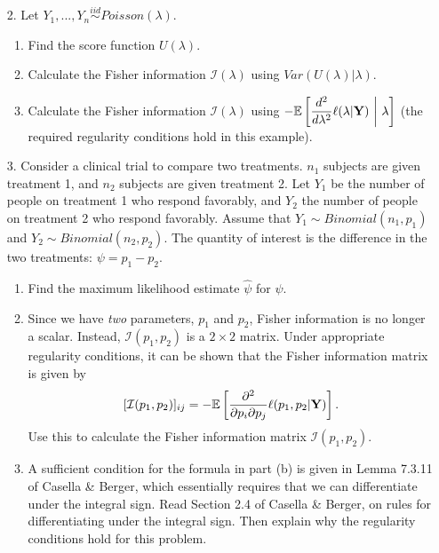 \documentclass[11pt]{article}
\begin{document}
\begin{enumerate}
\item[2.] Let $Y_1,...,Y_n \overset{iid}{\sim} Poisson(\lambda)$.
\begin{enumerate}
\item Find the score function $U(\lambda)$.
\item Calculate the Fisher information $\mathcal{I}(\lambda)$ using $Var(U(\lambda) | \lambda)$.
\item Calculate the Fisher information $\mathcal{I}(\lambda)$ using $-\mathbb{E}\left[ \dfrac{d^2}{d \lambda^2} \ell(\lambda | {\bf Y}) \ \biggr\lvert \ \lambda \right]$ (the required regularity conditions hold in this example).
\end{enumerate}

\item[3.] Consider a clinical trial to compare two treatments. $n_1$ subjects are given treatment 1, and $n_2$ subjects are given treatment 2. Let $Y_1$ be the number of people on treatment 1 who respond favorably, and $Y_2$ the number of people on treatment 2 who respond favorably. Assume that $Y_1 \sim Binomial(n_1, p_1)$ and $Y_2 \sim Binomial(n_2, p_2)$. The quantity of interest is the difference in the two treatments: $\psi = p_1 - p_2$.

\begin{enumerate}
\item Find the maximum likelihood estimate $\widehat{\psi}$ for $\psi$.

\item Since we have \textit{two} parameters, $p_1$ and $p_2$, Fisher information is no longer a scalar. Instead, $\mathcal{I}(p_1, p_2)$ is a $2 \times 2$ matrix. Under appropriate regularity conditions, it can be shown that the Fisher information matrix is given by
$$[\mathcal{I}(p_1, p_2)]_{ij} = - \mathbb{E}\left[ \frac{\partial^2}{\partial p_i \partial p_j} \ell(p_1, p_2 | {\bf Y}) \right].$$
Use this to calculate the Fisher information matrix $\mathcal{I}(p_1, p_2)$.

\item A sufficient condition for the formula in part (b) is given in Lemma 7.3.11 of Casella \& Berger, which essentially requires that we can differentiate under the integral sign. Read Section 2.4 of Casella \& Berger, on rules for differentiating under the integral sign. Then explain why the regularity conditions hold for this problem.
\end{enumerate}
\end{enumerate}
\end{document}
